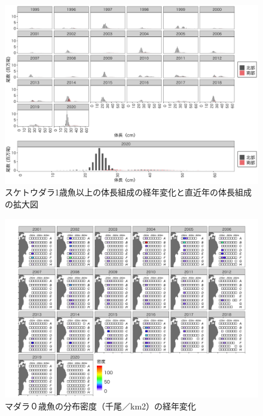 \documentclass[11pt]{article} %
\begin{document}
\begin{linenumbers}
\begin{figure}[h]
  \centering
  \includegraphics[width = 14cm]{スケトウダラ1+length.png}
  \caption{スケトウダラ1歳魚以上の体長組成の経年変化と直近年の体長組成の拡大図}
\end{figure}

\begin{figure}[h]
  \centering
  \includegraphics[width = 14cm]{マダラ０＋dens.png}
  \caption{マダラ０歳魚の分布密度（千尾／km2）の経年変化}
\end{figure}


\end{linenumbers}
\end{document}
